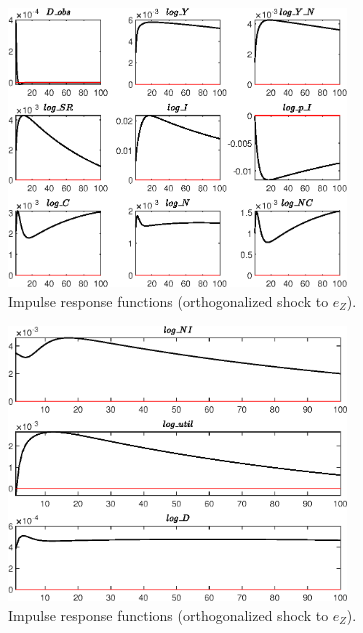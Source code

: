 \begin{figure}[H]
\centering 
\includegraphics[width=0.80\textwidth]{BRS_growth/graphs/BRS_growth_IRF_e_Z2}
\caption{Impulse response functions (orthogonalized shock to ${e_Z}$).}\label{Fig:IRF:e_Z:2}
\end{figure}
 
\begin{figure}[H]
\centering 
\includegraphics[width=0.80\textwidth]{BRS_growth/graphs/BRS_growth_IRF_e_Z3}
\caption{Impulse response functions (orthogonalized shock to ${e_Z}$).}\label{Fig:IRF:e_Z:3}
\end{figure}
 
